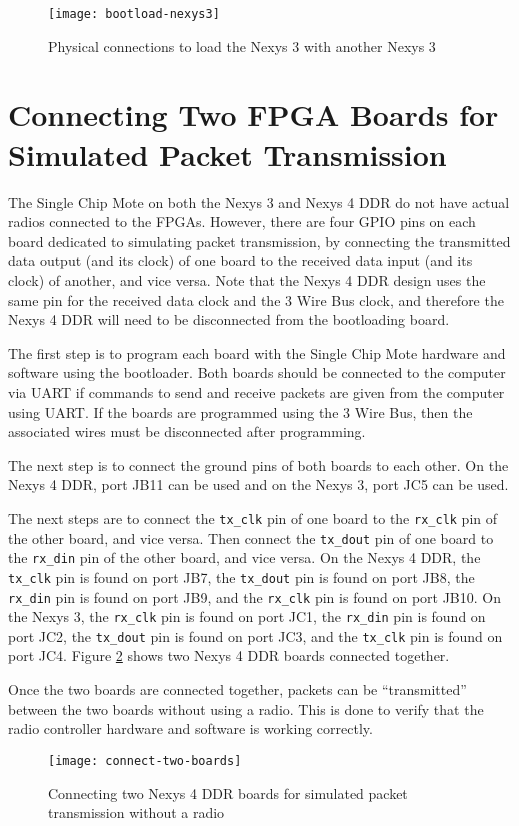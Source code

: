\begin{figure}
\centering
\texttt{[image: bootload-nexys3]}
\caption{Physical connections to load the Nexys 3 with another Nexys 3}
\label{fig:bootload-nexys3}
\end{figure}

\section{Connecting Two FPGA Boards for Simulated Packet Transmission} \label{connecting-two-boards}
The Single Chip Mote on both the Nexys 3 and Nexys 4 DDR do not have actual radios connected to the FPGAs. However, there are four GPIO pins on each board dedicated to simulating packet transmission, by connecting the transmitted data output (and its clock) of one board to the received data input (and its clock) of another, and vice versa. Note that the Nexys 4 DDR design uses the same pin for the received data clock and the 3 Wire Bus clock, and therefore the Nexys 4 DDR will need to be disconnected from the bootloading board.

The first step is to program each board with the Single Chip Mote hardware and software using the bootloader. Both boards should be connected to the computer via UART if commands to send and receive packets are given from the computer using UART. If the boards are programmed using the 3 Wire Bus, then the associated wires must be disconnected after programming.

The next step is to connect the ground pins of both boards to each other. On the Nexys 4 DDR, port JB11 can be used and on the Nexys 3, port JC5 can be used.

The next steps are to connect the \texttt{tx\_clk} pin of one board to the \texttt{rx\_clk} pin of the other board, and vice versa. Then connect the \texttt{tx\_dout} pin of one board to the \texttt{rx\_din} pin of the other board, and vice versa. On the Nexys 4 DDR, the \texttt{tx\_clk} pin is found on port JB7, the \texttt{tx\_dout} pin is found on port JB8, the \texttt{rx\_din} pin is found on port JB9, and the \texttt{rx\_clk} pin is found on port JB10. On the Nexys 3, the \texttt{rx\_clk} pin is found on port JC1, the \texttt{rx\_din} pin is found on port JC2, the \texttt{tx\_dout} pin is found on port JC3, and the \texttt{tx\_clk} pin is found on port JC4. Figure \ref{fig:connect-two-boards} shows two Nexys 4 DDR boards connected together.

Once the two boards are connected together, packets can be ``transmitted'' between the two boards without using a radio. This is done to verify that the radio controller hardware and software is working correctly.

\begin{figure}
	\centering
	\texttt{[image: connect-two-boards]}
	\caption{Connecting two Nexys 4 DDR boards for simulated packet transmission without a radio}
	\label{fig:connect-two-boards}
\end{figure}
